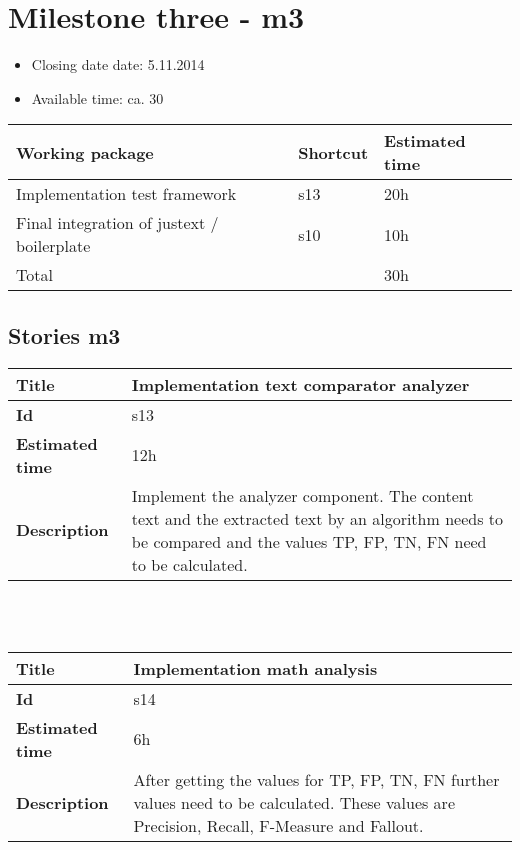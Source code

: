 \section{Milestone three - m3}

\begin{itemize}
\item Closing date date: 5.11.2014
\item Available time: ca. 30
\end{itemize}

    \begin{tabular}{ | p{10cm} | p{2cm} | p{2cm} |}
    \hline
    \textbf{Working package} & \textbf{Shortcut}& \textbf{Estimated time} \\ \hline
    Implementation test framework & s13 & 20h \\
    Final integration of justext / boilerplate & s10 & 10h \\ \hline
    Total &  & 30h\\
    \hline
    \end{tabular}

\subsection {Stories m3}

    \begin{tabular}{ | p{4cm} | p{10cm} |}
    \hline
    \textbf{Title} & Implementation text comparator analyzer \\ \hline
    \textbf{Id} & s13\\ \hline
    \textbf{Estimated time} & 12h \\ \hline
    \textbf{Description} & Implement the analyzer component. The content text and the extracted text by an algorithm needs to be compared and the values TP, FP, TN, FN need to be calculated.\\ 
    \hline
    \end{tabular} \\\\


    \begin{tabular}{ | p{4cm} | p{10cm} |}
    \hline
    \textbf{Title} & Implementation math analysis \\ \hline
    \textbf{Id} & s14\\ \hline
    \textbf{Estimated time} & 6h \\ \hline
    \textbf{Description} & After getting the values for TP, FP, TN, FN further values need to be calculated. These values are Precision, Recall, F-Measure and Fallout.\\ 
    \hline
    \end{tabular} \\\\


